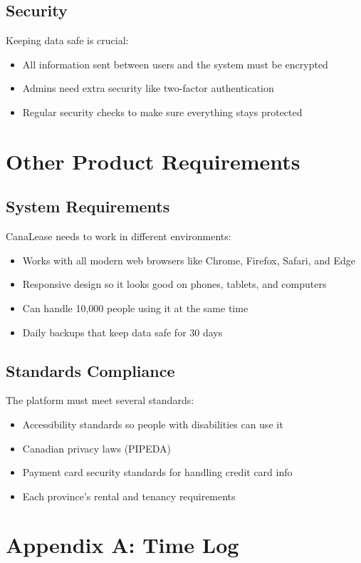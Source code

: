\documentclass[12pt]{article}
\begin{document}
\subsection{Security}
Keeping data safe is crucial:
\begin{itemize}
    \item All information sent between users and the system must be encrypted
    \item Admins need extra security like two-factor authentication
    \item Regular security checks to make sure everything stays protected
\end{itemize}

\section{Other Product Requirements}

\subsection{System Requirements}
CanaLease needs to work in different environments:
\begin{itemize}
    \item Works with all modern web browsers like Chrome, Firefox, Safari, and Edge
    \item Responsive design so it looks good on phones, tablets, and computers
    \item Can handle 10,000 people using it at the same time
    \item Daily backups that keep data safe for 30 days
\end{itemize}

\subsection{Standards Compliance}
The platform must meet several standards:
\begin{itemize}
    \item Accessibility standards so people with disabilities can use it
    \item Canadian privacy laws (PIPEDA)
    \item Payment card security standards for handling credit card info
    \item Each province's rental and tenancy requirements
\end{itemize}

\newpage
\appendix
\section*{Appendix A: Time Log}
\end{document}
